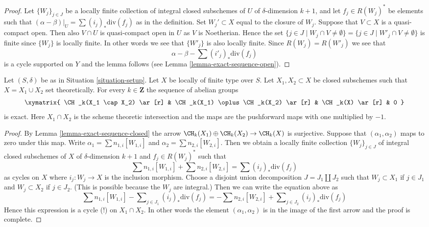 \begin{proof}
Let $\{W_j\}_{j \in J}$ be a locally finite collection of integral closed
subschemes of $U$ of $\delta$-dimension $k + 1$, and let $f_j \in R(W_j)^*$
be elements such that $(\alpha - \beta)|_U = \sum (i_j)_*\text{div}(f_j)$
as in the definition. Set $W_j' \subset X$ equal
to the closure of $W_j$. Suppose that $V \subset X$ is a quasi-compact
open. Then also $V \cap U$ is quasi-compact open in $U$ as
$V$ is Noetherian. Hence the set
$\{j \in J \mid W_j \cap V \not = \emptyset\}
= \{j \in J \mid W'_j \cap V \not = \emptyset\}$
is finite since $\{W_j\}$ is locally finite. In other words we see that
$\{W'_j\}$ is also locally finite. Since $R(W_j) = R(W'_j)$ we see
that
$$
\alpha - \beta - \sum (i'_j)_*\text{div}(f_j)
$$
is a cycle supported on $Y$ and the lemma follows (see
Lemma \ref{lemma-exact-sequence-open}).
\end{proof}

\begin{lemma}
\label{lemma-exact-sequence-closed-chow}
Let $(S, \delta)$ be as in Situation \ref{situation-setup}.
Let $X$ be locally of finite type over $S$. Let $X_1, X_2 \subset X$
be closed subschemes such that $X = X_1 \cup X_2$ set theoretically.
For every $k \in \mathbf{Z}$ the sequence of abelian groups
$$
\xymatrix{
\CH_k(X_1 \cap X_2) \ar[r] &
\CH_k(X_1) \oplus \CH_k(X_2) \ar[r] &
\CH_k(X) \ar[r] &
0
}
$$
is exact. Here $X_1 \cap X_2$ is the scheme theoretic intersection and the
maps are the pushforward maps with one multiplied by $-1$.
\end{lemma}

\begin{proof}
By Lemma \ref{lemma-exact-sequence-closed} the arrow
$\CH_k(X_1) \oplus \CH_k(X_2) \to \CH_k(X)$ is surjective.
Suppose that $(\alpha_1, \alpha_2)$ maps to zero under this map.
Write $\alpha_1 = \sum n_{1, i}[W_{1, i}]$ and
$\alpha_2 = \sum n_{2, i}[W_{2, i}]$. Then we obtain a locally
finite collection $\{W_j\}_{j \in J}$ of integral closed
subschemes of $X$ of $\delta$-dimension $k + 1$ and $f_j \in R(W_j)^*$
such that
$$
\sum n_{1, i}[W_{1, i}] + \sum n_{2, i}[W_{2, i}] = \sum (i_j)_*\text{div}(f_j)
$$
as cycles on $X$ where $i_j : W_j \to X$ is the inclusion morphism.
Choose a disjoint union decomposition $J = J_1 \amalg J_2$ such that
$W_j \subset X_1$ if $j \in J_1$ and $W_j \subset X_2$ if $j \in J_2$.
(This is possible because the $W_j$ are integral.) Then we can write
the equation above as
$$
\sum n_{1, i}[W_{1, i}] - \sum\nolimits_{j \in J_1} (i_j)_*\text{div}(f_j) =
- \sum n_{2, i}[W_{2, i}] + \sum\nolimits_{j \in J_2} (i_j)_*\text{div}(f_j)
$$
Hence this expression is a cycle (!) on $X_1 \cap X_2$. In other words
the element $(\alpha_1, \alpha_2)$ is in the image of the first arrow
and the proof is complete.
\end{proof}

